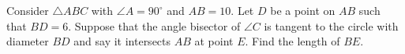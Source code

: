 Consider $\triangle{ABC}$ with $\angle{A}=90^{\circ}$ and $AB=10$. Let $D$ be a point on $AB$ such that $BD=6$. Suppose that the angle bisector of $\angle{C}$ is tangent to the circle with diameter $BD$ and say it intersects $AB$ at point $E$. Find the length of $BE$.
